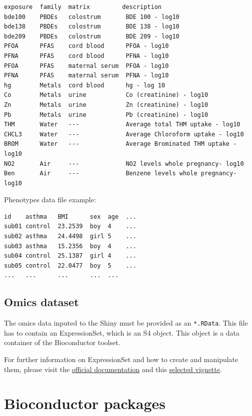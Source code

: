 \documentclass[
]{book}
\begin{document}
\begin{verbatim}
exposure  family  matrix         description
bde100    PBDEs   colostrum       BDE 100 - log10
bde138    PBDEs   colostrum       BDE 138 - log10
bde209    PBDEs   colostrum       BDE 209 - log10
PFOA      PFAS    cord blood      PFOA - log10
PFNA      PFAS    cord blood      PFNA - log10
PFOA      PFAS    maternal serum  PFOA - log10
PFNA      PFAS    maternal serum  PFNA - log10
hg        Metals  cord blood      hg - log 10
Co        Metals  urine           Co (creatinine) - log10
Zn        Metals  urine           Zn (creatinine) - log10
Pb        Metals  urine           Pb (creatinine) - log10
THM       Water   ---             Average total THM uptake - log10
CHCL3     Water   ---             Average Chloroform uptake - log10
BROM      Water   ---             Average Brominated THM uptake - log10
NO2       Air     ---             NO2 levels whole pregnancy- log10
Ben       Air     ---             Benzene levels whole pregnancy- log10
\end{verbatim}

Phenotypes data file example:

\begin{verbatim}
id    asthma   BMI      sex  age  ...
sub01 control  23.2539  boy  4    ...
sub02 asthma   24.4498  girl 5    ...
sub03 asthma   15.2356  boy  4    ...
sub04 control  25.1387  girl 4    ...
sub05 control  22.0477  boy  5    ...
...   ...      ...      ...  ...
\end{verbatim}

\hypertarget{omics-dataset}{%
\section{Omics dataset}\label{omics-dataset}}

The omics data inputed to the Shiny must be provided as an \texttt{*.RData}. This file has to contain an ExpressionSet, which is an S4 object. This object is a data container of the Bioconductor toolset.

For further information on ExpressionSet and how to create and manipulate them, please visit the \href{https://www.bioconductor.org/packages/devel/bioc/vignettes/Biobase/inst/doc/ExpressionSetIntroduction.pdf}{official documentation} and this \href{https://kasperdanielhansen.github.io/genbioconductor/html/ExpressionSet.html}{selected vignette}.

\hypertarget{bioconductor-packages}{%
\chapter{Bioconductor packages}\label{bioconductor-packages}}
\end{document}
